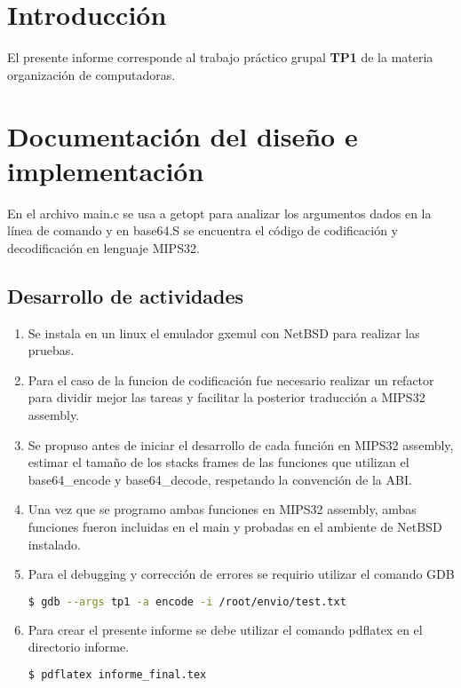 \documentclass[a4paper,11pt, margin=1in]{article}
\begin{document}
\newpage{}
\tableofcontents
\newpage{}

\section{Introducción}

El presente informe corresponde al trabajo práctico grupal \textbf{TP1} de la materia organización de computadoras.


\section{Documentación del diseño e implementación}
En el archivo main.c se usa a getopt para analizar los argumentos dados en la línea de comando y 
en base64.S se encuentra el código de codificación y decodificación en lenguaje MIPS32.


\subsection{{\normalsize Desarrollo de actividades}}

\begin{enumerate}
\item Se instala en un linux el emulador gxemul con NetBSD para realizar las pruebas.
\item Para el caso de la funcion de codificación fue necesario realizar un refactor para dividir mejor las tareas 
y facilitar la posterior traducción a MIPS32 assembly.
\item Se propuso antes de iniciar el desarrollo de cada función en MIPS32 assembly, estimar el tamaño de los 
stacks frames de las funciones que utilizan el base64\_encode y base64\_decode, 
respetando la convención de la ABI. 
\item Una vez que se programo ambas funciones en MIPS32 assembly, ambas funciones fueron incluidas en el main y
probadas en el ambiente de NetBSD instalado.
\item Para el debugging y corrección de errores se requirio utilizar el comando GDB
\begin{lstlisting}[language=bash,frame=\tiny]
$ gdb --args tp1 -a encode -i /root/envio/test.txt 
\end{lstlisting}
\item Para crear el presente informe se debe utilizar el comando pdflatex en el directorio informe.
\begin{lstlisting}[language=bash,frame=\tiny]
$ pdflatex informe_final.tex 
\end{lstlisting}

\end{enumerate}
\end{document}
